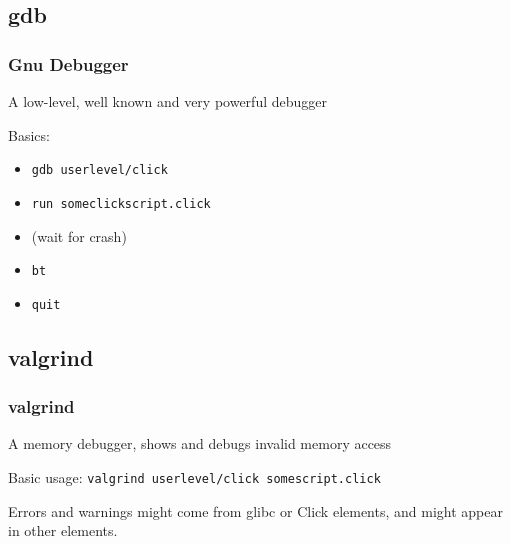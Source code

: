 \documentclass{beamer}
\begin{document}
\subsection{gdb} %
\label{sub:gdb}

\begin{frame}
\frametitle{Gnu Debugger}
A low-level, well known and very powerful debugger

Basics:
\begin{itemize}
	\item \lstinline!gdb userlevel/click!
	\item \lstinline!run someclickscript.click!
	\item (wait for crash)
	\item \lstinline!bt!
	\item \lstinline!quit!
\end{itemize}
\end{frame}

\subsection{valgrind} %
\label{sub:valgrind}

\begin{frame}
\frametitle{valgrind}
A memory debugger, shows and debugs invalid memory access

Basic usage: \lstinline!valgrind userlevel/click somescript.click!

Errors and warnings might come from glibc or Click elements, and might appear in other elements.
\end{frame}
\end{document}
